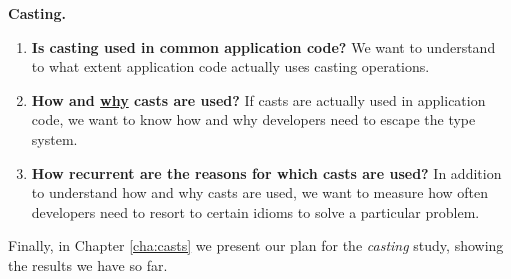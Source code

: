 \textbf{ Casting.}
\begin{enumerate}[label=$CRQ\arabic*:$,ref=$CRQ\arabic*$,leftmargin=3.4\parindent]
\item\label{casts:rq1}
{\bf Is casting used in common application code?}
We want to understand to what extent application code actually uses casting operations.

\item\label{casts:rq2}
{\bf How and \underline{why} casts are used?}
If casts are actually used in application code,
we want to know how and why developers need to escape the type system.

\item\label{casts:rq3}
{\bf How recurrent are the reasons for which casts are used?}
In addition to understand how and why casts are used,
we want to measure how often developers need to resort to certain idioms to solve a particular problem.
\end{enumerate}

Finally, in Chapter \ref{cha:casts} we present our
 plan for the \emph{casting} study, showing the results we have so far.

